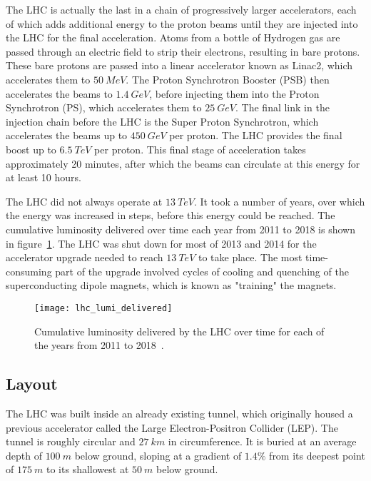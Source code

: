 The LHC is actually the last in a chain of progressively larger accelerators,
each of which adds additional energy to the proton beams until they are injected into the LHC for the final acceleration.
Atoms from a bottle of Hydrogen gas are passed through an electric field to strip their electrons,
resulting in bare protons.
These bare protons are passed into a linear accelerator known as Linac2, which accelerates them to $50~MeV$.
The Proton Synchrotron Booster (PSB) then accelerates the beams to $1.4~GeV$,
before injecting them into the Proton Synchrotron (PS), which accelerates them to $25~GeV$.
The final link in the injection chain before the LHC is the Super Proton Synchrotron,
which accelerates the beams up to $450~GeV$ per proton.
The LHC provides the final boost up to $6.5~TeV$ per proton.
This final stage of acceleration takes approximately 20 minutes, after which the beams can circulate at this energy for
at least 10 hours.

The LHC did not always operate at $13~TeV$.
It took a number of years, over which the energy was increased in steps, before this energy could be reached.
The cumulative luminosity delivered over time each year from 2011 to 2018 is shown in figure~\ref{fig:lhc_lumi_delivered}.
The LHC was shut down for most of 2013 and 2014 for the accelerator upgrade needed to reach $13~TeV$ to take place.
The most time-consuming part of the upgrade involved cycles of cooling and quenching of the superconducting dipole magnets,
which is known as "training" the magnets.

\begin{figure}[!ht]\centering
\texttt{[image: lhc\_lumi\_delivered]}
\caption{Cumulative luminosity delivered by the LHC over time for each of the years from 2011 to 2018~\cite{lhc-luminosity-public}.}
\label{fig:lhc_lumi_delivered}
\end{figure}

\subsection{Layout}\label{subsec:lhc_layout}

The LHC was built inside an already existing tunnel,
which originally housed a previous accelerator called the Large Electron-Positron Collider (LEP).
The tunnel is roughly circular and $27~km$ in circumference.
It is buried at an average depth of $100~m$ below ground, sloping at a gradient of $1.4\%$ from its deepest point
of $175~m$ to its shallowest at $50~m$ below ground.

